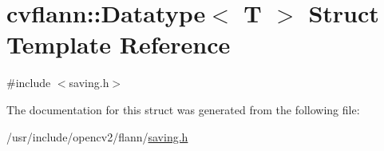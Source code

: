 \hypertarget{structcvflann_1_1Datatype}{\section{cvflann\-:\-:Datatype$<$ T $>$ Struct Template Reference}
\label{structcvflann_1_1Datatype}
}


{\ttfamily \#include $<$saving.\-h$>$}



The documentation for this struct was generated from the following file\-:\begin{DoxyCompactItemize}
\item 
/usr/include/opencv2/flann/\hyperlink{saving_8h}{saving.\-h}\end{DoxyCompactItemize}
